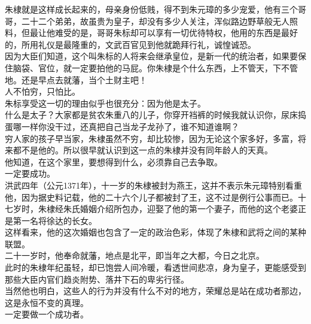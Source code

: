\begin{multicols}{\theparacolNo}
朱棣就是这样成长起来的，母亲身份低贱，得不到朱元璋的多少宠爱，他有三个哥哥，二十二个弟弟，故虽贵为皇子，却没有多少人关注，浑似路边野草般无人照料，但最让他难受的是，哥哥朱标却可以享有一切优待特权，他用的东西是最好的，所用礼仪是最隆重的，文武百官见到他就跪拜行礼，诚惶诚恐。\\

因为大臣们知道，这个叫朱标的人将来会继承皇位，是新一代的统治者，如果要保住脑袋、官位，就一定要拍他的马屁。你朱棣是个什么东西，上不管天，下不管地。还是早点去就藩，当个土财主吧！\\

人不怕穷，只怕比。\\

朱标享受这一切的理由似乎也很充分：因为他是太子。\\

什么是太子？大家都是贫农朱重八的儿子，你穿开裆裤的时候我就认识你，尿床捣蛋哪一样你没干过，还真把自己当龙子龙孙了，谁不知道谁啊？\\

穷人家的孩子早当家，朱棣虽然不穷，却比较惨，因为无论这个家多好，多富，将来都不是他的。所以很早就认识到这一点的朱棣并没有同年龄人的天真。\\

他知道，在这个家里，要想得到什么，必须靠自己去争取。\\

一定要成功。\\

洪武四年（公元1371年），十一岁的朱棣被封为燕王，这并不表示朱元璋特别看重他，因为据史料记载，他的二十六个儿子都被封了王，这不过是例行公事而已。十七岁时，朱棣经朱氏婚姻介绍所包办，迎娶了他的第一个妻子，而他的这个老婆正是第一名将徐达的长女。\\

这样看来，他的这次婚姻也包含了一定的政治色彩，体现了朱棣和武将之间的某种联盟。\\

二十一岁时，他奉命就藩，地点是北平，即当年之大都，今日之北京。\\

此时的朱棣年纪虽轻，却已饱尝人间冷暖，看透世间悲凉，身为皇子，更能感受到那些大臣内官们趋炎附势、落井下石的卑劣行径。\\

当然他也明白，这些人的行为并没有什么不对的地方，荣耀总是站在成功者那边，这是永恒不变的真理。\\

一定要做一个成功者。\\


\end{multicols}
